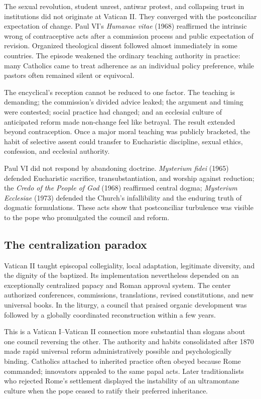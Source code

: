 The sexual revolution, student unrest, antiwar protest, and collapsing trust in institutions did not originate at Vatican II. They converged with the postconciliar expectation of change. Paul VI's \emph{Humanae vitae} (1968) reaffirmed the intrinsic wrong of contraceptive acts after a commission process and public expectation of revision. Organized theological dissent followed almost immediately in some countries. The episode weakened the ordinary teaching authority in practice: many Catholics came to treat adherence as an individual policy preference, while pastors often remained silent or equivocal.

The encyclical's reception cannot be reduced to one factor. The teaching is demanding; the commission's divided advice leaked; the argument and timing were contested; social practice had changed; and an ecclesial culture of anticipated reform made non-change feel like betrayal. The result extended beyond contraception. Once a major moral teaching was publicly bracketed, the habit of selective assent could transfer to Eucharistic discipline, sexual ethics, confession, and ecclesial authority.

Paul VI did not respond by abandoning doctrine. \emph{Mysterium fidei} (1965) defended Eucharistic sacrifice, transubstantiation, and worship against reduction; the \emph{Credo of the People of God} (1968) reaffirmed central dogma; \emph{Mysterium Ecclesiae} (1973) defended the Church's infallibility and the enduring truth of dogmatic formulations. These acts show that postconciliar turbulence was visible to the pope who promulgated the council and reform.

\subsection{The centralization paradox}

Vatican II taught episcopal collegiality, local adaptation, legitimate diversity, and the dignity of the baptized. Its implementation nevertheless depended on an exceptionally centralized papacy and Roman approval system. The center authorized conferences, commissions, translations, revised constitutions, and new universal books. In the liturgy, a council that praised organic development was followed by a globally coordinated reconstruction within a few years.

This is a Vatican I--Vatican II connection more substantial than slogans about one council reversing the other. The authority and habits consolidated after 1870 made rapid universal reform administratively possible and psychologically binding. Catholics attached to inherited practice often obeyed because Rome commanded; innovators appealed to the same papal acts. Later traditionalists who rejected Rome's settlement displayed the instability of an ultramontane culture when the pope ceased to ratify their preferred inheritance.

